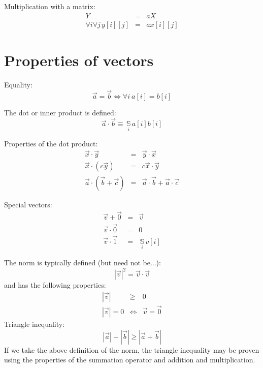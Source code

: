 \documentclass{article}
\newcommand{\inner}{\cdot}
\newcommand{\summation}[1]{\underset{#1}{\,\mathbb{S}\,}}
\begin{document}
Multiplication with a matrix:
\begin{eqnarray}
	Y & = & a X \\
	\forall i \forall j \, y[i][j] & = & a x[i][j]
\end{eqnarray}

\section{Properties of vectors}
\label{vectors}

Equality:
\begin{equation}
	\vec a = \vec b \iff \forall i~a[i] = b[i]
\end{equation}

The dot or inner product is defined:
\begin{equation}
	\vec a \inner \vec b \equiv \summation{i} a[i] b[i]
\end{equation}

Properties of the dot product:
\begin{eqnarray}
	\vec x \inner \vec y & = & \vec y \inner \vec x \\
	\vec x \inner (c \vec y) & = & c \vec x \inner \vec y \\
	\vec a \inner (\vec b + \vec c) & = & \vec a \inner \vec b + \vec a \inner \vec c
\end{eqnarray}

Special vectors:
\begin{eqnarray}
	\vec v + \vec 0 & = & \vec v \\
	\vec v \inner \vec 0 & = & 0 \\
	\vec v \inner \vec 1 & = & \summation{i} v[i]
\end{eqnarray}

The norm is typically defined (but need not be...):
\begin{equation}
	| \vec v |^2 = \vec v \inner \vec v
\end{equation}
and has the following properties:
\begin{eqnarray}
	| \vec v | & \ge & 0 \\
	| \vec v | = 0 & \iff & \vec v = \vec 0
\end{eqnarray}
Triangle inequality:
\begin{equation}
	| \vec a | + | \vec b | \ge | \vec a + \vec b |
\end{equation}
If we take the above definition of the norm, the triangle inequality may
be proven using the properties of the summation operator and addition
and multiplication.
\end{document}
